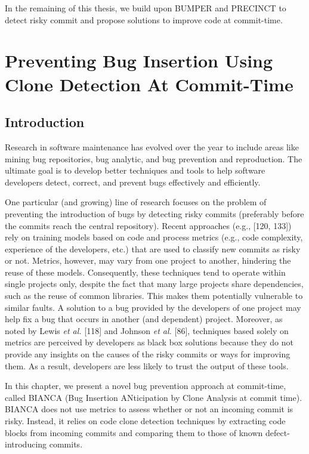 \documentclass[12pt]{report}
\begin{document}
In the remaining of this thesis, we build upon BUMPER and PRECINCT to
detect risky commit and propose solutions to improve code at
commit-time.

\chapter{Preventing Bug Insertion Using Clone Detection At
Commit-Time}\label{preventing-bug-insertion-using-clone-detection-at-commit-time}

\section{Introduction}\label{introduction-3}

Research in software maintenance has evolved over the year to include
areas like mining bug repositories, bug analytic, and bug prevention and
reproduction. The ultimate goal is to develop better techniques and
tools to help software developers detect, correct, and prevent bugs
effectively and efficiently.

One particular (and growing) line of research focuses on the problem of
preventing the introduction of bugs by detecting risky commits
(preferably before the commits reach the central repository). Recent
approaches (e.g., {[}120, 133{]}) rely on training models based on code
and process metrics (e.g., code complexity, experience of the
developers, etc.) that are used to classify new commits as risky or not.
Metrics, however, may vary from one project to another, hindering the
reuse of these models. Consequently, these techniques tend to operate
within single projects only, despite the fact that many large projects
share dependencies, such as the reuse of common libraries. This makes
them potentially vulnerable to similar faults. A solution to a bug
provided by the developers of one project may help fix a bug that occurs
in another (and dependent) project. Moreover, as noted by Lewis \emph{et
al.} {[}118{]} and Johnson \emph{et al.} {[}86{]}, techniques based
solely on metrics are perceived by developers as black box solutions
because they do not provide any insights on the causes of the risky
commits or ways for improving them. As a result, developers are less
likely to trust the output of these tools.

In this chapter, we present a novel bug prevention approach at
commit-time, called BIANCA (Bug Insertion ANticipation by Clone Analysis
at commit time). BIANCA does not use metrics to assess whether or not an
incoming commit is risky. Instead, it relies on code clone detection
techniques by extracting code blocks from incoming commits and comparing
them to those of known defect-introducing commits.
\end{document}
